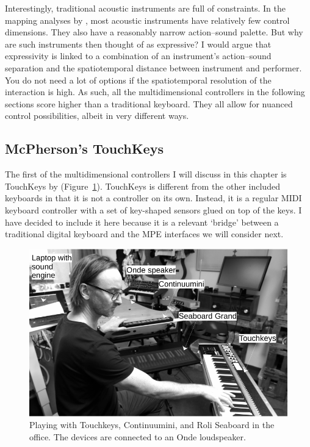 Interestingly, traditional acoustic instruments are full of constraints. In the mapping analyses by \citet{kvifte_instruments_1989}, most acoustic instruments have relatively few control dimensions. They also have a reasonably narrow action--sound palette. But why are such instruments then thought of as expressive? I would argue that expressivity is linked to a combination of an instrument's action--sound separation and the spatiotemporal distance between instrument and performer. You do not need a lot of options if the spatiotemporal resolution of the interaction is high. As such, all the multidimensional controllers in the following sections score higher than a traditional keyboard. They all allow for nuanced control possibilities, albeit in very different ways.


\subsection{McPherson's TouchKeys}

The first of the multidimensional controllers I will discuss in this chapter is TouchKeys by \citet{mcpherson_touchkeys_2012} (Figure~\ref{fig:touchkeys}). TouchKeys is different from the other included keyboards in that it is not a controller on its own. Instead, it is a regular MIDI keyboard controller with a set of key-shaped sensors glued on top of the keys. I have decided to include it here because it is a relevant `bridge' between a traditional digital keyboard and the MPE interfaces we will consider next.

\begin{figure}[tbp]
		\includegraphics[width=1\columnwidth]{figures/63-mpe-instruments-crop.pdf}
	\caption{Playing with Touchkeys, Continuumini, and Roli Seaboard in the office. The devices are connected to an Onde loudspeaker.}
	\label{fig:touchkeys}
\end{figure}

